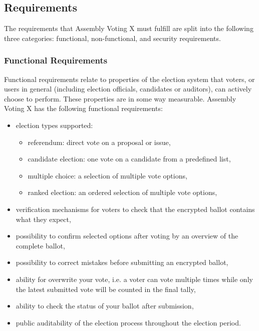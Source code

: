 \subsection{Requirements} \label{sec: requirements}
The requirements that Assembly Voting X must fulfill are split into the following three categories: functional, non-functional, and security requirements.


\subsubsection{Functional Requirements} \label{sec: functional requirements}
Functional requirements relate to properties of the election system that voters, or users in general (including election officials, candidates or auditors), can actively choose to perform. These properties are in some way measurable. Assembly Voting X has the following functional requirements:

\begin{itemize}
    \item election types supported:
    \begin{itemize}
        \item referendum: direct vote on a proposal or issue,
        \item candidate election: one vote on a candidate from a predefined list,
        \item multiple choice: a selection of multiple vote options,
        \item ranked election: an ordered selection of multiple vote options,
    \end{itemize}
    \item verification mechanisms for voters to check that the encrypted ballot contains what they expect,
    \item possibility to confirm selected options after voting by an overview of the complete ballot,
    \item possibility to correct mistakes before submitting an encrypted ballot,
    \item ability for overwrite your vote, i.e. a voter can vote multiple times while only the latest submitted vote will be counted in the final tally,
    \item ability to check the status of your ballot after submission,
    \item public auditability of the election process throughout the election period.
\end{itemize}


